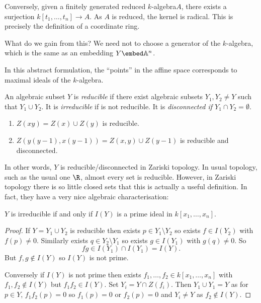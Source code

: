 \documentclass[a4paper]{article}
\renewcommand{\A}{\mathbb{A}}
\begin{document}
Conversely, given a finitely generated reduced \(k\)-algebra\(A\), there exists a surjection \(k[t_1, \dots, t_n] \to A\). As \(A\) is reduced, the kernel is radical. This is precisely the definition of a coordinate ring.

What do we gain from this? We need not to choose a generator of the \(k\)-algebra, which is the same as an embedding \(Y \embed \A^n\).

In this abstract formulation, the ``points'' in the affine space corresponds to maximal ideals of the \(k\)-algebra.

\begin{definition}
  An algebraic subset \(Y\) is \emph{reducible} if there exist algebraic subsets \(Y_1, Y_2 \neq Y\) such that \(Y_1 \cup Y_2\). It is \emph{irreducible} if is not reducible. It is \emph{disconnected if \(Y_1 \cap Y_2 = \emptyset\)}.
\end{definition}

\begin{eg}\leavevmode
  \begin{enumerate}
  \item \(Z(xy) = Z(x) \cup Z(y)\) is reducible.
  \item \(Z(y(y - 1), x(y - 1)) = Z(x, y) \cup Z(y - 1)\) is reducible and disconnected.
  \end{enumerate}
\end{eg}

In other words, \(Y\) is reducible/disconnected in Zariski topology. In usual topology, such as the usual one \(\R\), almost every set is reducible. However, in Zariski topology there is so little closed sets that this is actually a useful definition. In fact, they have a very nice algebraic characterisation:

\begin{lemma}
  \(Y\) is irreducible if and only if \(I(Y)\) is a prime ideal in \(k[x_1, \dots, x_n]\).
\end{lemma}

\begin{proof}
  If \(Y = Y_1 \cup Y_2\) is reducible then exists \(p \in Y_1 \setminus Y_2\) so exists \(f \in I(Y_2)\) with \(f(p) \neq 0\). Similarly exists \(q \in Y_2 \setminus Y_1\) so exists \(g \in I(Y_1)\) with \(g(q) \neq 0\). So
  \[
    fg \in I(Y_1) \cap I(Y_1) = I(Y).
  \]
  But \(f, g \notin I(Y)\) so \(I(Y)\) is not prime.

  Conversely if \(I(Y)\) is not prime then exists \(f_1, \dots, f_2 \in k[x_1, \dots, x_n]\) with \(f_1, f_2 \notin I(Y)\) but \(f_1f_2 \in I(Y)\). Set \(Y_i = Y \cap Z(f_i)\). Then \(Y_1 \cup Y_1 = Y\) as for \(p \in Y\), \(f_1f_2(p) = 0\) so \(f_1(p) = 0\) or \(f_2(p) = 0\) and \(Y_i \neq Y\) as \(f_2 \notin I(Y)\).
\end{proof}
\end{document}
